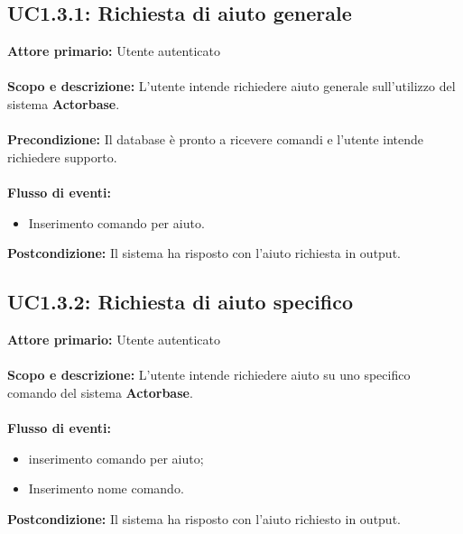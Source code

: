 \documentclass{scalatekids-article}
\begin{document}
\subsection{UC1.3.1: Richiesta di aiuto generale}
\textbf{Attore primario:} Utente autenticato\\ \\
\textbf{Scopo e descrizione:} L'utente intende richiedere aiuto generale sull'utilizzo del sistema \textbf{Actorbase}.\\ \\
\textbf{Precondizione:} Il database è pronto a ricevere comandi e l'utente intende richiedere supporto.\\ \\
\textbf{Flusso di eventi:}
\begin{itemize}
\item Inserimento comando per aiuto.
\end{itemize}
\textbf{Postcondizione:} Il sistema ha risposto con l'aiuto richiesta in output.
\subsection{UC1.3.2: Richiesta di aiuto specifico}
\textbf{Attore primario:} Utente autenticato\\ \\
\textbf{Scopo e descrizione:} L'utente intende richiedere aiuto su uno specifico comando del sistema \textbf{Actorbase}.\\ \\
\textbf{Flusso di eventi:}
\begin{itemize}
\item inserimento comando per aiuto;
\item Inserimento nome comando.
\end{itemize}
\textbf{Postcondizione:} Il sistema ha risposto con l'aiuto richiesto in output.
\end{document}
